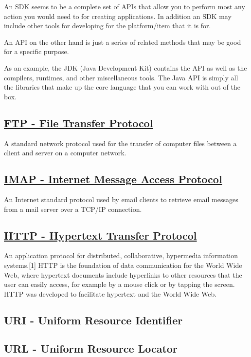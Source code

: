 \documentclass[11pt]{article}
\begin{document}
An SDK seems to be a complete set of APIs that allow you to perform most any action you would need to for creating applications. In addition an SDK may include other tools for developing for the platform/item that it is for.

An API on the other hand is just a series of related methods that may be good for a specific purpose.

As an example, the JDK (Java Development Kit) contains the API as well as the compilers, runtimes, and other miscellaneous tools. The Java API is simply all the libraries that make up the core language that you can work with out of the box.
\subsection{\href{https://en.wikipedia.org/wiki/File\_Transfer\_Protocol}{FTP - File Transfer Protocol}}
\label{sec:org5afe466}
A standard network protocol used for the transfer of computer files between a client and server on a computer network.
\subsection{\href{https://en.wikipedia.org/wiki/Internet\_Message\_Access\_Protocol}{IMAP - Internet Message Access Protocol}}
\label{sec:orge42b86e}
An Internet standard protocol used by email clients to retrieve email messages from a mail server over a TCP/IP connection.
\subsection{\href{https://en.wikipedia.org/wiki/Hypertext\_Transfer\_Protocol}{HTTP - Hypertext Transfer Protocol}}
\label{sec:org89296c2}
An application protocol for distributed, collaborative, hypermedia information systems.[1] HTTP is the foundation of data communication for the World Wide Web, where hypertext documents include hyperlinks to other resources that the user can easily access, for example by a mouse click or by tapping the screen. HTTP was developed to facilitate hypertext and the World Wide Web.
\subsection{URI - Uniform Resource Identifier}
\label{sec:orgb03abb0}
\subsection{URL - Uniform Resource Locator}
\label{sec:org3b74ad4}
\end{document}
